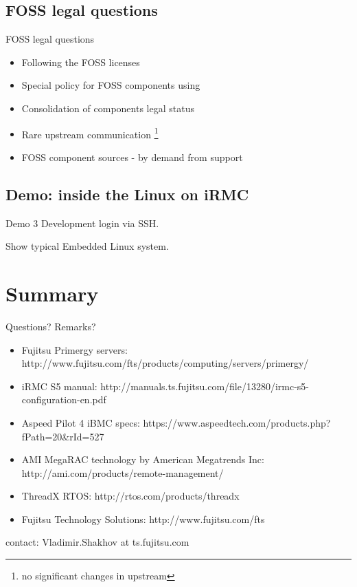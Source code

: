 \documentclass{beamer}
\begin{document}
  \subsection{FOSS legal questions}
  \begin{frame}{FOSS legal questions}
	  \begin{itemize}
		  \item Following the FOSS licenses
		  \item Special policy for FOSS components using
		  \item Consolidation of components legal status
		  \item Rare upstream communication \footnote{no significant changes in upstream}
		  \item FOSS component sources - by demand from support
	  \end{itemize}
  \end{frame}

  \subsection{Demo: inside the Linux on iRMC}
  \begin{frame}{Demo 3}
	 Development login via SSH.

	 Show typical Embedded Linux system.
  \end{frame}



\section*{Summary}
\begin{frame}{Questions? Remarks?}
  
  \begin{center}
  \end{center}

  \begin{itemize}
	  \item \tiny{Fujitsu Primergy servers: http://www.fujitsu.com/fts/products/computing/servers/primergy/ }
	  \item \tiny{iRMC S5 manual: http://manuals.ts.fujitsu.com/file/13280/irmc-s5-configuration-en.pdf}
	  \item \tiny{Aspeed Pilot 4 iBMC specs: https://www.aspeedtech.com/products.php?fPath=20\&rId=527}
	  \item \tiny{AMI MegaRAC technology by American Megatrends Inc: http://ami.com/products/remote-management/}
	  \item \tiny{ThreadX RTOS: http://rtos.com/products/threadx }
	  \item \tiny{Fujitsu Technology Solutions: http://www.fujitsu.com/fts}
	\end{itemize}

  contact: Vladimir.Shakhov at ts.fujitsu.com


\end{frame}
\end{document}
